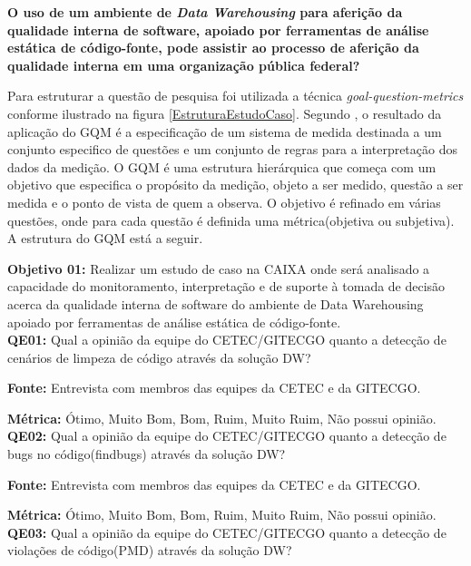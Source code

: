 \textbf{O uso de um ambiente de \textit{Data Warehousing} para aferição da qualidade interna de software, apoiado por ferramentas de análise estática de código-fonte,  pode assistir ao processo de aferição da qualidade interna em uma organização pública federal?}

Para estruturar a questão de pesquisa foi utilizada a técnica \textit{goal-question-metrics} conforme ilustrado na figura \ref{EstruturaEstudoCaso}. Segundo \cite{Basili96b}, o resultado da aplicação do GQM é a especificação de um sistema de medida destinada a um conjunto especifico de questões e um conjunto de regras para a interpretação dos dados da medição. O GQM é uma estrutura hierárquica que começa com um objetivo que especifica o propósito da medição, objeto a ser medido, questão a ser medida e o ponto de vista de quem a observa. O objetivo é refinado em várias questões, onde para cada questão é definida uma métrica(objetiva ou subjetiva)\cite{Basili96b}. A estrutura do GQM está a seguir.

\textbf{Objetivo 01:} Realizar um estudo de caso na CAIXA onde será analisado a capacidade do monitoramento, interpretação e de suporte à tomada de decisão acerca da qualidade interna de software do ambiente de Data Warehousing apoiado por ferramentas de análise estática de código-fonte.\\



\textbf{QE01:} Qual a opinião da equipe do CETEC/GITECGO quanto a detecção de cenários de limpeza de código através da solução DW?

\textbf{Fonte:} Entrevista com membros das equipes da CETEC e da GITECGO.

\textbf{Métrica:} Ótimo, Muito Bom, Bom, Ruim, Muito Ruim, Não possui opinião. \\



\textbf{QE02: } Qual a opinião da equipe do CETEC/GITECGO quanto a detecção de bugs no código(findbugs) através da solução DW?

\textbf{Fonte:} Entrevista com membros das equipes da CETEC e da GITECGO.

\textbf{Métrica:} Ótimo, Muito Bom, Bom, Ruim, Muito Ruim, Não possui opinião.\\



\textbf{QE03: } Qual a opinião da equipe do CETEC/GITECGO quanto a detecção de violações de código(PMD) através da solução DW?

